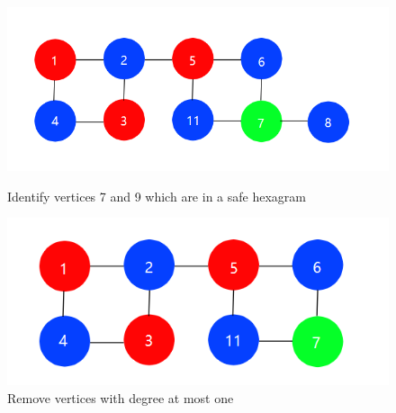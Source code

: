 \begin{figure}[htbp]
\centering
\begin{minipage}[t]{0.5\textwidth}
\centering
\includegraphics[width=1\textwidth]{figure/3.png}
\caption{\small Identify vertices 7 and 9 which are in a safe hexagram}
\end{minipage}
\begin{minipage}[t]{0.4\textwidth}
\centering
\includegraphics[width=1\textwidth]{figure/4.png}
\caption{\small Remove vertices with degree at most one}
\end{minipage}
\end{figure}

